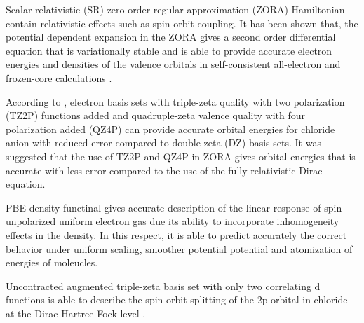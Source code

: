 \documentclass[a4paper,11pt]{report}
\begin{document}
Scalar relativistic (SR) zero-order regular approximation (ZORA) Hamiltonian contain relativistic effects such as spin orbit coupling. It has been shown that, the potential dependent expansion in the ZORA gives a second order differential equation that is variationally stable and is able to provide accurate electron energies and densities of the valence orbitals in self-consistent all-electron and frozen-core calculations \citep{lenthe1993relativistic}.

According to \citep{van2003optimized}, electron basis sets with triple-zeta quality with two polarization (TZ2P) functions added and quadruple-zeta valence quality with four polarization added (QZ4P) can provide accurate orbital energies for chloride anion with reduced error compared to double-zeta (DZ) basis sets. It was suggested that the use of TZ2P and QZ4P in ZORA gives orbital energies that is accurate with less error compared to the use of the fully relativistic Dirac equation.

PBE density functinal \citep{perdew1996generalized} gives accurate description of the linear response of spin-unpolarized uniform electron gas due its ability to incorporate inhomogeneity effects in the density. In this respect, it is able to predict accurately the correct behavior under uniform scaling, smoother potential potential and atomization of energies of moleucles.  

Uncontracted augmented triple-zeta basis set with only two correlating d functions is able to describe the spin-orbit splitting of the 2p orbital in chloride at the Dirac-Hartree-Fock level \citep{dyall2016relativistic}.
\end{document}
